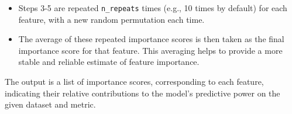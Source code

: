\documentclass[
  letterpaper,
  DIV=11,
  numbers=noendperiod]{scrreprt}
\providecommand{\tightlist}{%
  \setlength{\itemsep}{0pt}\setlength{\parskip}{0pt}}\usepackage{longtable,booktabs,array}
\begin{document}
\begin{enumerate}
  \begin{itemize}
  \tightlist
  \item
    Steps 3-5 are repeated \texttt{n\_repeats} times (e.g., 10 times by
    default) for each feature, with a new random permutation each time.
  \item
    The average of these repeated importance scores is then taken as the
    final importance score for that feature. This averaging helps to
    provide a more stable and reliable estimate of feature importance.
  \end{itemize}
\end{enumerate}

The output is a list of importance scores, corresponding to each
feature, indicating their relative contributions to the model's
predictive power on the given dataset and metric.
\end{document}
